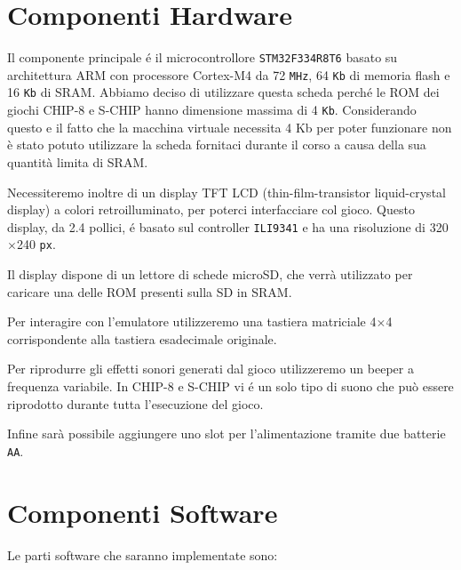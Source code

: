 \documentclass[a4paper]{article}
\begin{document}
\section{Componenti Hardware}



Il componente principale é il microcontrollore \texttt{STM32F334R8T6} basato su architettura ARM con processore Cortex-M4 da 72 \texttt{MHz}, 64 \texttt{Kb} di memoria flash e 16 \texttt{Kb} di SRAM. Abbiamo deciso di utilizzare questa scheda perché le ROM dei giochi CHIP-8 e S-CHIP hanno dimensione massima di 4 \texttt{Kb}. Considerando questo e il fatto che la macchina virtuale necessita 4 Kb per poter funzionare non è stato potuto utilizzare la scheda fornitaci durante il corso a causa della sua quantità limita di SRAM.

Necessiteremo inoltre di un display TFT LCD (thin-film-transistor liquid-crystal display) a colori retroilluminato, per poterci interfacciare col gioco. Questo display, da 2.4 pollici, é basato sul controller \texttt{ILI9341} e ha una risoluzione di 320$\times$240 \texttt{px}.

Il display dispone di un lettore di schede microSD, che verrà utilizzato per caricare una delle ROM presenti sulla SD in SRAM.

Per interagire con l'emulatore utilizzeremo una tastiera matriciale 4$\times$4 corrispondente alla tastiera esadecimale originale.

Per riprodurre gli effetti sonori generati dal gioco utilizzeremo un beeper a frequenza variabile. In CHIP-8 e S-CHIP vi é un solo tipo di suono che può essere riprodotto durante tutta l'esecuzione del gioco.

Infine sarà possibile aggiungere uno slot per l'alimentazione tramite due batterie \texttt{AA}.

\section{Componenti Software}

Le parti software che saranno implementate sono:
\end{document}
